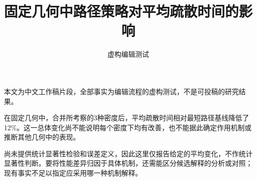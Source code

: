 \documentclass[fontset=none,UTF8,11pt]{ctexart}
\begin{document}
\title{固定几何中路径策略对平均疏散时间的影响}
\author{虚构编辑测试}
\date{}
\maketitle
\noindent 本文为中文工作稿片段，全部事实为编辑流程的虚构测试，不是可投稿的研究结果。

在固定几何中，合并所考察的3种密度后，平均疏散时间相对最短路径基线降低了12\%。这一总体变化尚不能说明每个密度下均有改善，也不能据此确定作用机制或推断其他几何中的表现。

尚未提供统计显著性检验和误差定义，因此这里仅报告给定的平均变化，不作统计显著性判断。要将性能差异归因于具体机制，还需能区分候选解释的分析或对照；现有事实不足以指定应采用哪一种机制解释。
\end{document}
